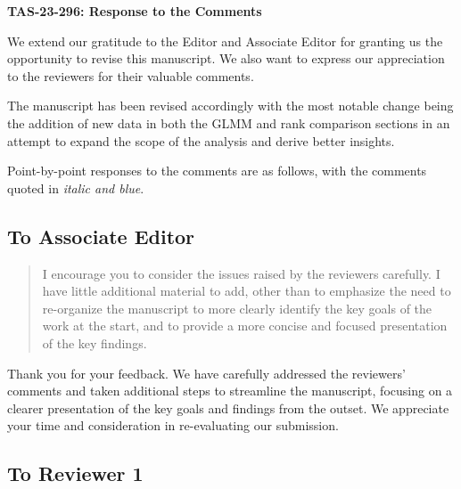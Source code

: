 \documentclass[12pt]{article}
\newenvironment{comment}%
{\begin{quotation}\noindent\small\it\color{darkblue}\ignorespaces%
}{\end{quotation}}
\begin{document}
\begin{center}
  {\Large\bf TAS-23-296: Response to the Comments}
\end{center}

We extend our gratitude to the Editor and Associate Editor for 
granting us the opportunity to revise this manuscript. We also want to
express our appreciation to the reviewers for their valuable comments. 


The manuscript has been revised accordingly with the most notable change being 
the addition of new data in both the GLMM and rank comparison sections in an
attempt to expand the scope of the analysis and derive better insights. 


Point-by-point responses to the comments are as follows, with the
comments quoted in \emph{\color{darkblue} italic and blue}.



\subsection*{To Associate Editor}

\begin{comment}
I encourage you to consider the issues raised by the reviewers carefully. I have
little additional material to add, other than to emphasize the need to
re-organize the manuscript to more clearly identify the key goals of the work at
the start, and to provide a more concise and focused presentation of the key
findings.
\end{comment}

Thank you for your feedback. We have carefully addressed the
reviewers' comments and taken additional steps to streamline the
manuscript, focusing on a clearer presentation of the key goals and
findings from the outset. We appreciate your time and consideration in
re-evaluating our submission.


\subsection*{To Reviewer 1}
\end{document}
